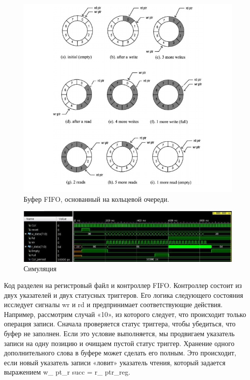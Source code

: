 \begin{figure}[h]
\centering
\includegraphics[width=1.1\textwidth]{circular_queue}
\caption{Буфер FIFO, основанный на кольцевой очереди.}
\label{circular_queue_label}
\end{figure}





\begin{figure}[h]
\centering
\includegraphics[width=1.1\textwidth]{simulation1}
\caption{Симуляция}
\label{simulation_label}
\end{figure}

Код разделен на регистровый файл и контроллер FIFO. Контроллер состоит из двух указателей и двух статусных триггеров. Его логика следующего состояния исследует сигналы wr и rd и предпринимает соответствующие действия. Например, рассмотрим случай «10», из которого следует, что происходит только операция записи. Сначала проверяется статус триггера, чтобы убедиться, что буфер не заполнен. Если это условие выполняется, мы продвигаем указатель записи на одну позицию и очищаем пустой статус триггер. Хранение одного дополнительного слова в буфере может сделать его полным. Это происходит, если новый указатель записи «ловит» указатель чтения, который задается выражением w\_ pt\_r succ = r\_ ptr\_reg.

